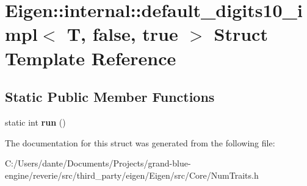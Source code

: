 \hypertarget{struct_eigen_1_1internal_1_1default__digits10__impl_3_01_t_00_01false_00_01true_01_4}{}\section{Eigen\+::internal\+::default\+\_\+digits10\+\_\+impl$<$ T, false, true $>$ Struct Template Reference}
\label{struct_eigen_1_1internal_1_1default__digits10__impl_3_01_t_00_01false_00_01true_01_4}
\subsection*{Static Public Member Functions}
\begin{DoxyCompactItemize}
\item 
\mbox{\label{struct_eigen_1_1internal_1_1default__digits10__impl_3_01_t_00_01false_00_01true_01_4_a6cb192e4c9043235d1d1926cbf94e88a}} 
static int {\bfseries run} ()
\end{DoxyCompactItemize}


The documentation for this struct was generated from the following file\+:\begin{DoxyCompactItemize}
\item 
C\+:/\+Users/dante/\+Documents/\+Projects/grand-\/blue-\/engine/reverie/src/third\+\_\+party/eigen/\+Eigen/src/\+Core/Num\+Traits.\+h\end{DoxyCompactItemize}
